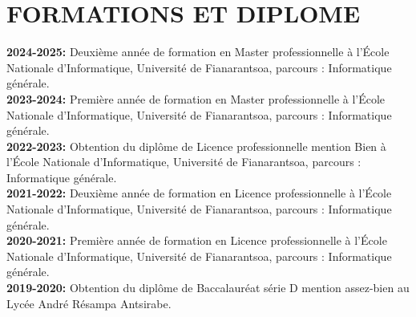 \documentclass[12pt]{report}
\begin{document}
			\section*{FORMATIONS ET DIPLOME}
			\begin{minipage}{\textwidth}
				\textbf{2024-2025:} Deuxième année de formation en Master professionnelle à l’École Nationale d'Informatique, Université de Fianarantsoa, parcours : Informatique générale.\\[0.5cm]
				\textbf{2023-2024:} Première année de formation en Master professionnelle à l’École Nationale d'Informatique, Université de Fianarantsoa, parcours : Informatique générale.\\[0.5cm]
				\textbf{2022-2023:} Obtention du diplôme de Licence professionnelle mention Bien à l’École Nationale d'Informatique, Université de Fianarantsoa, parcours : Informatique générale.\\[0.5cm]
				\textbf{2021-2022:} Deuxième année de formation en Licence professionnelle à l’École Nationale d'Informatique, Université de Fianarantsoa, parcours : Informatique générale.\\[0.5cm]
				\textbf{2020-2021:} Première année de formation en Licence professionnelle à l’École Nationale d'Informatique, Université de Fianarantsoa, parcours : Informatique générale.\\[0.5cm]
				\textbf{2019-2020:} Obtention du diplôme de Baccalauréat série D mention assez-bien au Lycée André Résampa Antsirabe.
			\end{minipage}
\end{document}
